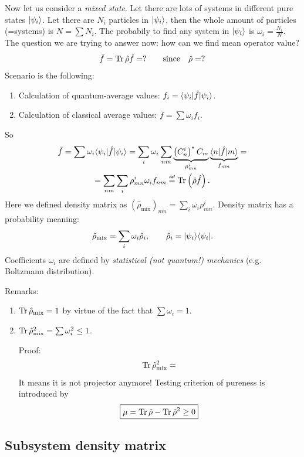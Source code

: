 Now let us consider a \textit{mixed state}. Let there are lots of systems in different pure states $\lvert\psi_i\rangle$. Let there are $N_i$ particles in $\lvert\psi_i\rangle$, then the whole amount of particles (=systems) is $N = \sum N_i$. The probabily to find any system in $\lvert\psi_i\rangle$ is $\omega_i = \frac{N_i}{N}$. The question we are trying to answer now: how can we find mean operator value?
\begin{equation}
	\bar{f} = \operatorname{Tr} \hat{\rho} \hat{f} = ? \qquad \text{since} \quad \hat{\rho} = ? 
\end{equation}
Scenario is the following:
\begin{enumerate}
	\item Calculation of quantum-average values: $f_i = \langle\psi_i\rvert \hat{f} \lvert\psi_i\rangle$.
	\item Calculation of classical average values: $\bar{f} = \sum \omega_i f_i$.
\end{enumerate}
So
\begin{multline}
	\bar{f} = \sum \omega_i \bra{\psi_i} \hat{f} \ket{\psi_i} = \sum_i \omega_i \sum_{nm} \underbrace{\left( C_n^i \right)^* C_m}_{\rho_{mn}^i} \underbrace{\bra{n} \hat{f} \ket{m}}_{f_{nm}} = \\
	= \sum_{nm} \sum_i \rho_{mn}^i \omega_i f_{nm} \myeq \Tr \left( \hat{\rho} \hat{f} \right).
\end{multline}
Here we defined density matrix as $\left( \hat{\rho}_{\text{mix}} \right)_{mn} = \sum_i \omega_i \rho_{mn}^i$. Density matrix has a probability meaning:
\begin{equation}
	\hat{\rho}_{\text{mix}} = \sum_i \omega_i \hat{\rho}_i, \qquad \hat{\rho}_i = \lvert\psi_i\rangle \langle\psi_i\rvert.
\end{equation}
Coefficients $\omega_i$ are defined by \textit{statistical (not quantum!) mechanics} (e.g. Boltzmann distribution).

Remarks:
\begin{enumerate}
	\item $\operatorname{Tr} \hat{\rho}_{\text{mix}} = 1$ by virtue of the fact that $\sum \omega_i = 1$.
	\item $\operatorname{Tr} \hat{\rho}_{\text{mix}}^2 = \sum \omega_i^2 \le 1$. 
	
	Proof:
	\begin{multline}
		\operatorname{Tr} \hat{\rho}_{\text{mix}}^2 = 
	\end{multline}
	It means it is not projector anymore! Testing criterion of pureness is introduced by
	\begin{equation}
		\boxed{\mu = \operatorname{Tr} \hat{\rho} - \operatorname{Tr} \hat{\rho}^2 \ge 0}
	\end{equation}
\end{enumerate}

\subsection{Subsystem density matrix}